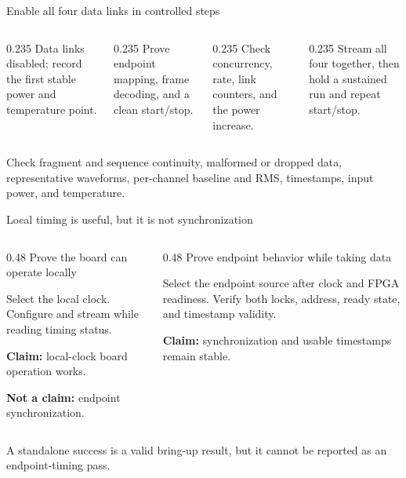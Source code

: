 \documentclass[aspectratio=169,11pt]{beamer}
\begin{document}
\begin{frame}{Enable all four data links in controlled steps}
  \begin{columns}[T,onlytextwidth]
    \begin{column}{0.235\textwidth}
        {Data links disabled; record the first stable power and temperature point.}
    \end{column}
    \begin{column}{0.235\textwidth}
        {Prove endpoint mapping, frame decoding, and a clean start/stop.}
    \end{column}
    \begin{column}{0.235\textwidth}
        {Check concurrency, rate, link counters, and the power increase.}
    \end{column}
    \begin{column}{0.235\textwidth}
        {Stream all four together, then hold a sustained run and repeat start/stop.}
    \end{column}
  \end{columns}

  \medskip
    {Check fragment and sequence continuity, malformed or dropped data, representative waveforms, per-channel baseline and RMS, timestamps, input power, and temperature.}
\end{frame}

\begin{frame}{Local timing is useful, but it is not synchronization}
  \begin{columns}[T,onlytextwidth]
    \begin{column}{0.48\textwidth}
        {Prove the board can operate locally}
        {Select the local clock. Configure and stream while reading timing status.\par\smallskip
         \textbf{Claim:} local-clock board operation works.\par
         \textbf{Not a claim:} endpoint synchronization.}
    \end{column}
    \begin{column}{0.48\textwidth}
        {Prove endpoint behavior while taking data}
        {Select the endpoint source after clock and FPGA readiness. Verify both locks, address, ready state, and timestamp validity.\par\smallskip
         \textbf{Claim:} synchronization and usable timestamps remain stable.}
    \end{column}
  \end{columns}

  \smallskip
    {A standalone success is a valid bring-up result, but it cannot be reported as an endpoint-timing pass.}
\end{frame}
\end{document}
